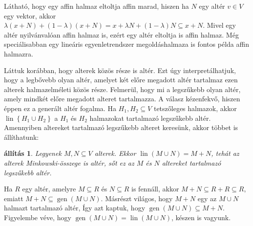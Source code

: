 \documentclass[9pt, showtrims]{memoir}
\makeatletter
\renewenvironment{proof}[1][\proofname]
    {\par\pushQED{\qed}%
    \normalfont \topsep6\p@\@plus6\p@\relax
    \trivlist
    \item[\hskip\labelsep
        \itshape
    #1\@addpunct{:}]\ignorespaces}
    {\popQED\endtrivlist\@endpefalse}
\theoremstyle{plain}
\newtheorem{proposition}{állítás}[section]
\theoremstyle{remark}
\theoremstyle{definition}
\DeclareMathOperator{\lin}{lin}
\DeclareMathOperator{\gen}{gen}
\makeatother
\begin{document}
Látható, hogy egy affin halmaz eltoltja affin marad,
hiszen ha 
 $N$ egy altér $v\in V$ egy vektor,
akkor
$
\lambda\left( x+N \right)+\left( 1-\lambda \right)\left( x+N \right)
=
x+\lambda N+\left( 1-\lambda \right)N
\subseteq
x+N
$.
Mivel egy altér nyilvánvalóan affin halmaz is, 
ezért egy altér eltoltja is affin halmaz. 
Még speciálisabban egy lineáris egyenletrendszer megoldáshalmaza is fontos példa affin halmazra.

Láttuk korábban, hogy alterek közös része is altér.
Ezt úgy interpretálhatjuk, hogy a legbővebb olyan altér,
amelyet két előre megadott altér tartalmaz ezen alterek halmazelméleti közös része.
Felmerül, hogy mi a legszűkebb olyan altér, amely mindkét előre megadott alteret tartalmazza.
A válasz kézenfekvő, hiszen éppen ez a generált altér fogalma.
Ha $H_1,H_2\subseteq V$ tetszőleges halmazok, akkor 
$\lin\left\{ H_1\cup H_2 \right\}$ a $H_1$ és $H_2$ halmazokat tartalmazó legszűkebb altér.
Amennyiben altereket tartalmazó legszűkebb alteret keresünk,
akkor többet is állíthatunk:
\begin{proposition}
    Legyenek $M,N\subseteq V$ alterek.
    Ekkor 
    $\lin(M\cup N)=M+N$,
    tehát az alterek Minkowski-összege is altér, sőt ez az $M$ és $N$ altereket tartalmazó
    legszűkebb altér.
\end{proposition}
\begin{proof}
    Ha $R$ egy altér, amelyre $M\subseteq R$ és $N\subseteq R$ is fennáll,
    akkor $M+N\subseteq R+R\subseteq R$, emiatt 
    $M+N\subseteq \gen(M\cup N)$.
    Másrészt világos, hogy $M+N$ egy az $M\cup N$ halmazt tartalmazó altér, 
    Így azt kaptuk, hogy 
    \begin{math}
        \gen(M\cup N)\subseteq M+N.
    \end{math}
    Figyelembe véve, hogy $\gen(M\cup N)=\lin(M\cup N)$, 
    készen is vagyunk.
\end{proof}
\end{document}
